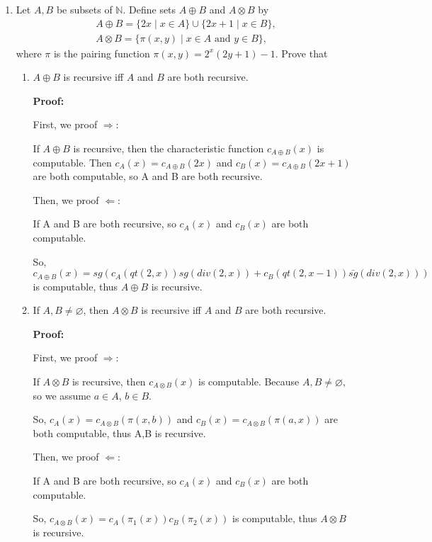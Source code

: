 \documentclass[12pt,a4paper]{article}
\theoremstyle{definition}
\numberwithin{equation}{section}
\numberwithin{figure}{section}
\begin{document}
\begin{enumerate}
\item Let $A,B$ be subsets of $\mathbb{N}$. Define sets $A\oplus B$ and $A\otimes B$ by
$$
\begin{array}{l}
A\oplus B=\{2x \mid x\in A\}\cup\{2x+1 \mid x\in B\},\\[3pt]
A\otimes B=\{\pi (x,y) \mid x\in A \mbox{ and } y\in B\},
\end{array}$$
where $\pi$ is the pairing function $\pi(x,y)=2^x(2y+1)-1$. Prove that
  \begin{enumerate}
  \item $A\oplus B$ is recursive iff $A$ and $B$ are both recursive.
  
  \textbf{Proof:}
  
  First, we proof $\Rightarrow$:
  
  If $A \oplus B$ is recursive, then the characteristic function $c_{A \oplus B}(x)$ is computable. Then $c_A(x) = c_{A \oplus B}(2x)$ and $c_B(x) = c_{A \oplus B}(2x+1)$ are both computable, so A and B are both recursive.
  
  Then, we proof $\Leftarrow$:
  
  If A and B are both recursive, so $c_A(x)$ and $c_B(x)$ are both computable. 
  
  So, $c_{A \oplus B}(x) = sg(c_A(qt(2,x))sg(div(2,x))+c_B(qt(2,x-1)) \bar{sg}(div(2,x)))$ is computable, thus $A \oplus B$ is recursive.
  
  
  
  \item If $A,B\neq\varnothing$, then $A\otimes B$ is recursive iff $A$ and $B$ are both recursive.
  
  \textbf{Proof:}
  
  First, we proof $\Rightarrow$:
  
  If $A \otimes B$ is recursive, then $c_{A \otimes B}(x)$ is computable. Because $A,B\neq\varnothing$, so we assume $a \in A$, $b \in B$.
  
  So, $c_A(x) = c_{A \otimes B}(\pi(x,b))$ and $c_B(x) = c_{A \otimes B}(\pi(a,x))$ are both computable, thus A,B is recursive.
  
  Then, we proof $\Leftarrow$:
  
  If A and B are both recursive, so $c_A(x)$ and $c_B(x)$ are both computable.
  
  So, $c_{A \otimes B}(x) = c_A(\pi_1(x))c_B(\pi_2(x))$ is computable, thus $A \otimes B$ is recursive.
  
  \end{enumerate}


\end{enumerate}
\end{document}
